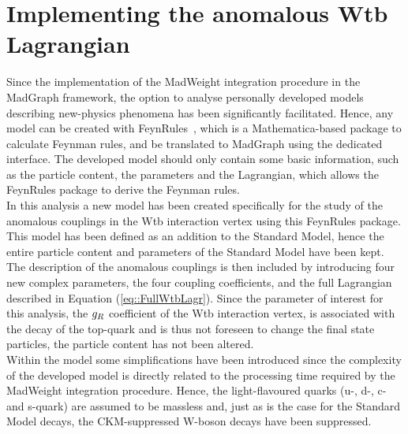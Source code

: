 \section{Implementing the anomalous Wtb Lagrangian} \label{sec::FRModel}

Since the implementation of the MadWeight integration procedure in the MadGraph framework, the option to analyse personally developed models describing new-physics phenomena has been significantly facilitated.
Hence, any model can be created with FeynRules~\cite{FeynRules}, which is a Mathematica-based package to calculate Feynman rules, and be translated to MadGraph using the dedicated interface.
The developed model should only contain some basic information, such as the particle content, the parameters and the Lagrangian, which allows the FeynRules package to derive the Feynman rules.
\\
In this analysis a new model has been created specifically for the study of the anomalous couplings in the Wtb interaction vertex using this FeynRules package.
This model has been defined as an addition to the Standard Model, hence the entire particle content and parameters of the Standard Model have been kept.
The description of the anomalous couplings is then included by introducing four new complex parameters, the four coupling coefficients, and the full Lagrangian described in Equation (\ref{eq::FullWtbLagr}).
Since the parameter of interest for this analysis, the $g_{R}$ coefficient of the Wtb interaction vertex, is associated with the decay of the top-quark and is thus not foreseen to change the final state particles, the particle content has not been altered.
\\
Within the model some simplifications have been introduced since the complexity of the developed model is directly related to the processing time required by the MadWeight integration procedure.
Hence, the light-flavoured quarks (u-, d-, c- and s-quark) are assumed to be massless and, just as is the case for the Standard Model decays, the CKM-suppressed W-boson decays have been suppressed.
\\

